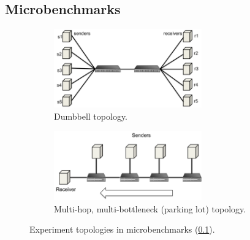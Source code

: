 \subsection{Microbenchmarks}
\label{micro}


\begin{figure}[!t]
        \centering
        \begin{subfigure}[b]{0.5\textwidth}
                \centering
                \includegraphics[width=0.7\textwidth]{figures/dumbbell_topology.pdf}
                \caption{Dumbbell topology.}
                \label{dumbbell_topology}
        \end{subfigure}
        \begin{subfigure}[b]{0.5\textwidth}
                \centering
                \includegraphics[width=0.7\textwidth]{figures/parkinglot_topology.pdf}
                \caption{Multi-hop, multi-bottleneck (parking lot) topology.}
                \label{parkinglot_topology}
        \end{subfigure}
	\caption{Experiment topologies in microbenchmarks (\cref{micro}).}
	\label{microbenchmarks_topology}
\end{figure}	

